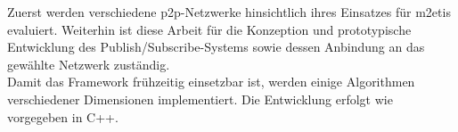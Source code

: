 Zuerst werden verschiedene \ac{p2p}-Netzwerke hinsichtlich ihres Einsatzes für \ac{m2etis} evaluiert. Weiterhin ist diese Arbeit für die Konzeption und prototypische Entwicklung des Publish/Subscribe-Systems sowie dessen Anbindung an das gewählte Netzwerk zuständig.\\
Damit das Framework frühzeitig einsetzbar ist, werden einige Algorithmen verschiedener Dimensionen implementiert. Die Entwicklung erfolgt wie vorgegeben in C++.

